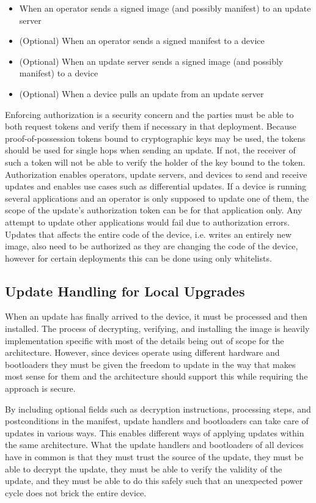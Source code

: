 \documentclass[0-thesis.tex]{subfiles}
\begin{document}
\begin{itemize}
    \item When an operator sends a signed image (and possibly manifest) to an update
            server
    \item (Optional) When an operator sends a signed manifest to a device
    \item (Optional) When an update server sends a signed image (and possibly manifest) to a device
    \item (Optional) When a device pulls an update from an update server
\end{itemize}

Enforcing authorization is a security concern and the parties must be able to both request
tokens and verify them if necessary in that deployment. Because proof-of-possession tokens
bound to cryptographic keys may be used, the tokens should be used for single hops when
sending an update. If not, the receiver of such a token will not be able to verify the
holder of the key bound to the token. Authorization enables operators, update servers, and
devices to send and receive updates and enables use cases such as differential updates. If
a device is running several applications and an operator is only supposed to update one of
them, the scope of the update's authorization token can be for that application only. Any
attempt to update other applications would fail due to authorization errors. Updates that
affects the entire code of the device, i.e. writes an entirely new image, also need to be
authorized as they are changing the code of the device, however for certain deployments
this can be done using only whitelists.

\subsection{Update Handling for Local Upgrades}
\label{ssec:upgrading}
When an update has finally arrived to the device, it must be processed and then installed.
The process of decrypting, verifying, and installing the image is heavily implementation
specific with most of the details being out of scope for the architecture. However, since
devices operate using different hardware and bootloaders they must be given the freedom to
update in the way that makes most sense for them and the architecture should support this
while requiring the approach is secure.

By including optional fields such as decryption instructions, processing steps, and
postconditions in the manifest, update handlers and bootloaders can take care of updates
in various ways. This enables different ways of applying updates within the same
architecture. What the update handlers and bootloaders of all devices have in common is
that they must trust the source of the update, they must be able to decrypt the update,
they must be able to verify the validity of the update, and they must be able to do this
safely such that an unexpected power cycle does not brick the entire device.
\end{document}
